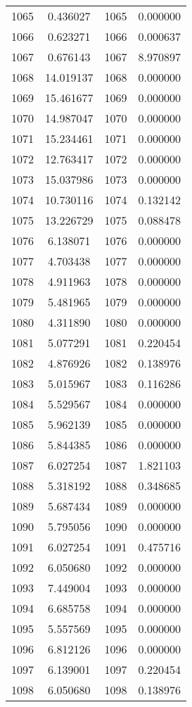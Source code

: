 \documentclass[12pt]{article}
\begin{document}
\begin{longtable}{@{}cccc@{}}
1065 & 0.436027 & 1065 & 0.000000 \\
1066 & 0.623271 & 1066 & 0.000637 \\
1067 & 0.676143 & 1067 & 8.970897 \\
1068 & 14.019137 & 1068 & 0.000000 \\
1069 & 15.461677 & 1069 & 0.000000 \\
1070 & 14.987047 & 1070 & 0.000000 \\
1071 & 15.234461 & 1071 & 0.000000 \\
1072 & 12.763417 & 1072 & 0.000000 \\
1073 & 15.037986 & 1073 & 0.000000 \\
1074 & 10.730116 & 1074 & 0.132142 \\
1075 & 13.226729 & 1075 & 0.088478 \\
1076 & 6.138071 & 1076 & 0.000000 \\
1077 & 4.703438 & 1077 & 0.000000 \\
1078 & 4.911963 & 1078 & 0.000000 \\
1079 & 5.481965 & 1079 & 0.000000 \\
1080 & 4.311890 & 1080 & 0.000000 \\
1081 & 5.077291 & 1081 & 0.220454 \\
1082 & 4.876926 & 1082 & 0.138976 \\
1083 & 5.015967 & 1083 & 0.116286 \\
1084 & 5.529567 & 1084 & 0.000000 \\
1085 & 5.962139 & 1085 & 0.000000 \\
1086 & 5.844385 & 1086 & 0.000000 \\
1087 & 6.027254 & 1087 & 1.821103 \\
1088 & 5.318192 & 1088 & 0.348685 \\
1089 & 5.687434 & 1089 & 0.000000 \\
1090 & 5.795056 & 1090 & 0.000000 \\
1091 & 6.027254 & 1091 & 0.475716 \\
1092 & 6.050680 & 1092 & 0.000000 \\
1093 & 7.449004 & 1093 & 0.000000 \\
1094 & 6.685758 & 1094 & 0.000000 \\
1095 & 5.557569 & 1095 & 0.000000 \\
1096 & 6.812126 & 1096 & 0.000000 \\
1097 & 6.139001 & 1097 & 0.220454 \\
1098 & 6.050680 & 1098 & 0.138976 \\

\end{longtable}
\end{document}
